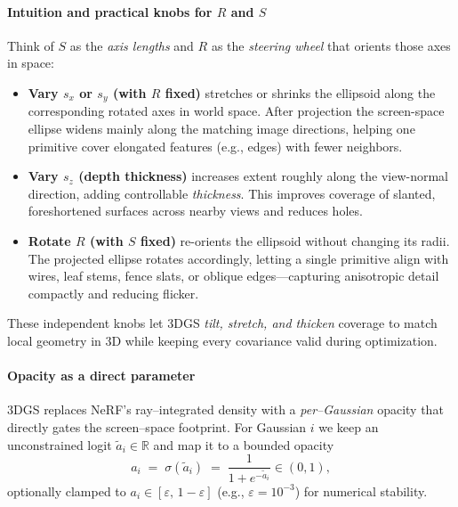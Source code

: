 \begin{enrichment}
\begin{enrichment}
\begin{enrichment}
        \paragraph{Intuition and practical knobs for $R$ and $S$}
        Think of $S$ as the \emph{axis lengths} and $R$ as the \emph{steering wheel} that orients those axes in space:
        \begin{itemize}
            \item \textbf{Vary $s_x$ or $s_y$ (with $R$ fixed)} \; stretches or shrinks the ellipsoid along the corresponding rotated axes in world space. 
            After projection the screen-space ellipse widens mainly along the matching image directions, helping one primitive cover elongated features (e.g., edges) with fewer neighbors.
            \item \textbf{Vary $s_z$ (depth thickness)} \; increases extent roughly along the view-normal direction, adding controllable \emph{thickness}. 
            This improves coverage of slanted, foreshortened surfaces across nearby views and reduces holes.
            \item \textbf{Rotate $R$ (with $S$ fixed)} \; re-orients the ellipsoid without changing its radii. 
            The projected ellipse rotates accordingly, letting a single primitive align with wires, leaf stems, fence slats, or oblique edges—capturing anisotropic detail compactly and reducing flicker.
        \end{itemize}
        These independent knobs let 3DGS \emph{tilt, stretch, and thicken} coverage to match local geometry in 3D while keeping every covariance valid during optimization.
        
        \paragraph{Opacity as a direct parameter}
        3DGS replaces NeRF’s ray–integrated density with a \emph{per–Gaussian} opacity that directly gates the screen–space footprint.
        For Gaussian $i$ we keep an unconstrained logit $\tilde a_i\in\mathbb{R}$ and map it to a bounded opacity
        \[
        a_i \;=\; \sigma(\tilde a_i) \;=\; \frac{1}{1+e^{-\tilde a_i}} \in (0,1),
        \]
        optionally clamped to $a_i\in[\varepsilon,\,1-\varepsilon]$ (e.g., $\varepsilon=10^{-3}$) for numerical stability.
        
        \newpage
        

\end{enrichment}
\end{enrichment}
\end{enrichment}
